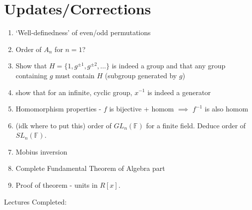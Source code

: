\section*{Updates/Corrections}

\begin{enumerate}
    \item `Well-definedness' of even/odd permutations
    \item Order of $A_n$ for $n=1$?
    \item Show that $H = \{1, g^{\pm 1}, g^{\pm 2}, \ldots \}$ is indeed a group and that any group containing $g$ must contain $H$ (subgroup generated by $g$)
    \item show that for an infinite, cyclic group, $x^{-1}$ is indeed a generator
    \item Homomorphism properties - $f$ is bijective + homom $\implies$ $f^{-1}$ is also homom
    \item (idk where to put this) order of $GL_n(\mathbb{F})$ for a finite field. Deduce order of $SL_n(\mathbb{F})$.
    \item Mobius inversion 
    \item Complete Fundamental Theorem of Algebra part
    \item Proof of theorem - units in $R[x]$.
\end{enumerate}

Lectures Completed:

